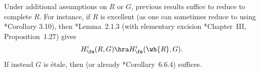 \brem \label{rem:easy-complete}
Under additional assumptions on $R$ or $G$, previous results suffice to reduce  to complete $R$.
For instance, if $R$ is excellent (as one can sometimes reduce to using \cite{Pop19}*{Corollary 3.10}),
then \cite{BC19}*{Lemma~2.1.3} (with elementary excision \cite{Mil80}*{Chapter~III, Proposition~1.27}) %
gives %
\[
H^i_\fm(R, G) \hra H^i_{\fm}(\wh{R}, G).
\]
If instead $G$ is \'{e}tale, then  (or already \cite{Fuj95}*{Corollary~6.6.4}) suffices. %
